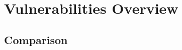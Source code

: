 \chapter{Vulnerabilities Overview}\label{chapter:vulnerabilities_overview}

\section{\doge}
\section{\gnb}
\section{Comparison}
